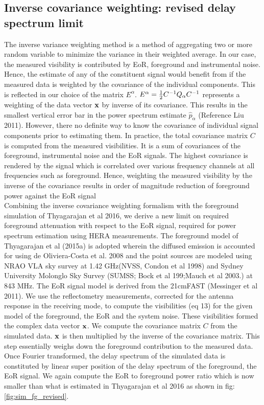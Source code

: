 \documentclass[twocolumn]{emulateapj}
\begin{document}
\subsection{Inverse covariance weighting: revised delay spectrum limit}
The inverse variance weighting method is a method of aggregating two or more random variable to minimize the variance in their weighted average. In our case, the measured visibility is contributed by EoR, foreground and instrumental noise. Hence, the estimate of any of the constituent signal would benefit from if the measured data is weighted by the covariance of the individual components. This is reflected in our choice of the matrix $E^{\alpha}$.  $E^{\alpha} = {1 \over 2} C^{-1} Q_{\alpha} C^{-1}$ represents a weighting of the data vector $\bold x$ by inverse of its covariance. This results in the smallest vertical error bar in the power spectrum estimate $\hat p_{\alpha}$ (Reference Liu 2011). 
However, there no definite way to know the covariance of individual signal components prior to estimating them. In practice, the total covariance matrix $C$ is computed from the measured visibilities. It is a sum of covariances of the foreground, instrumental noise and the EoR signals. The highest covariance is rendered by the signal which is correlated over various frequency channels at all frequencies such as foreground. Hence, weighting the measured visibility by the inverse of the covariance results in order of magnitude reduction of foreground power against the EoR signal \\
 Combining the inverse covariance weighting formalism with the foreground simulation of Thyagarajan et al 2016, we derive a new limit on required foreground attenuation with respect to the EoR signal, required for power spectrum estimation using HERA measurements. The foreground model of Thyagarajan et al (2015a) is adopted wherein the diffused emission is accounted for using de Oliviera-Costa et al. 2008 and the point sources are modeled using NRAO VLA sky survey at 1.42 GHz(NVSS, Condon et al 1998) and Sydney University Molonglo Sky Survey (SUMSS; Bock et al 199;Mauch et al 2003.) at 843 MHz. The EoR signal model is derived from the 21cmFAST (Messinger et al 2011). We use the reflectometry measurements, corrected for the antenna response in the receiving mode, to compute the visibilities (eq 13) for the given model of the foreground, the EoR and the system noise. These visibilities formed the complex data vector $\bold x$. We compute the covariance matrix $C$ from the simulated data. $\bold x$ is then multiplied by the inverse of the covariance matrix. This step essentially weighs down the foreground contribution to the measured data. Once Fourier transformed, the delay spectrum of the simulated data is constituted by linear super position of the delay spectrum of the foreground, the EoR signal.  We again compute the EoR to foreground power ratio which is now smaller than what is estimated in Thyagarajan et al 2016 as shown in fig:\ref{fig:sim_fg_revised}. 
\end{document}
